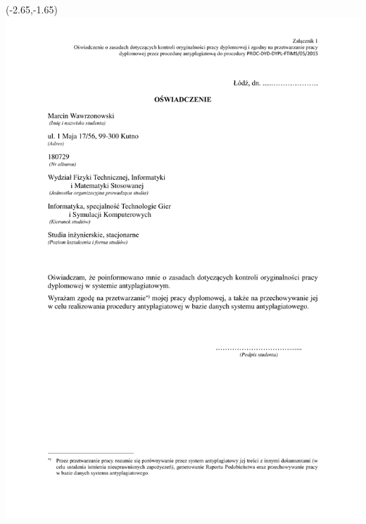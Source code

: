 \documentclass[12pt, oneside, a4paper]{mwbk}
\begin{document}
\newpage
\thispagestyle{empty}
\begin{textblock}{1}(-2.65,-1.65)
\includegraphics{figures/zal1.pdf}
\end{textblock}
\newpage
\thispagestyle{empty}
\end{document}
